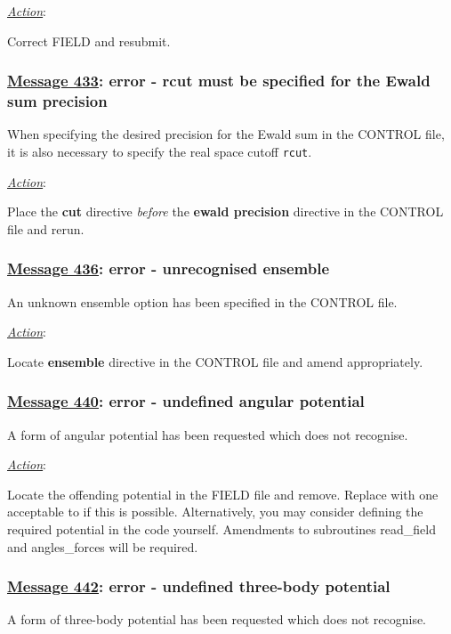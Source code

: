 \noindent \underline{\em Action}:

Correct FIELD and resubmit.

\subsubsection*{\underline{Message 433}: error - rcut must be specified for the Ewald sum precision}

When specifying the desired precision for the Ewald
sum in the CONTROL file, it is also
necessary to specify the real space cutoff {\tt rcut}.

\noindent \underline{\em Action}:

Place the {\bf cut} directive {\em before} the {\bf ewald
precision} directive in the CONTROL file and rerun.

\subsubsection*{\underline{Message 436}: error - unrecognised ensemble }

An unknown ensemble option has been specified in the CONTROL file.

\noindent \underline{\em Action}:

Locate {\bf ensemble} directive in the CONTROL file and amend
appropriately.

\subsubsection*{\underline{Message 440}: error - undefined angular potential}

A form of angular potential has been requested which \D does not
recognise.

\noindent \underline{\em Action}:

Locate the offending potential in the FIELD file and remove.
Replace with one acceptable to \D if this is possible.
Alternatively, you may consider defining the required potential in
the code yourself.  Amendments to subroutines {\sc read\_field}
and {\sc angles\_forces} will be required.

\subsubsection*{\underline{Message 442}: error - undefined three-body potential}

A form of three-body potential has been requested which \D does
not recognise.

